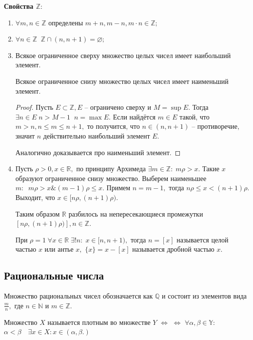 \par\medskip \textbf{Свойства $\mathbb{Z}:$}\par
\begin{enumerate}
\item $\forall m, n\in \mathbb{Z}$ определены $m+n, m-n, m\cdot n \in\mathbb{Z};$
\item $\forall n\in\mathbb{Z}\;\; \mathbb{Z}\cap(n, n+1)=\varnothing;$
\item Всякое ограниченное сверху множество целых чисел имеет наибольший элемент.
\par Всякое ограниченное снизу множество целых чисел имеет наименьший элемент.
\begin{proof}
Пусть $E\subset\mathbb{Z}, E$ -- ограничено сверху и $M=\sup E.$ Тогда $\exists n\in E \; n>M-1 \;\; n =\max E.$ Если найдётся $m\in E$ такой, что $m>n, n\leq m\leq n+1,$ то получится, что $n\in(n, n+1)$ -- противоречие, значит $n$ действительно наибольший элемент $E.$

Аналогично доказывается про наименьший элемент.
\end{proof}
\item Пусть $\rho>0, x\in\mathbb{R},$ по принципу Архимеда $\exists m\in\mathbb{Z}: \; m\rho>x.$ Такие $x$ образуют ограниченное снизу множество. Выберем наименьшее $m:\;\; m\rho>x \mathbin{\&} (m-1)\rho\leq x.$ Примем $n=m-1,$ тогда $n\rho\leq x< (n+1)\rho.$ Выходит, что $x\in[n\rho, (n+1)\rho).$ 

Таким образом $\mathbb{R}$ разбилось на непересекающиеся промежутки $[n\rho, (n+1)\rho)], n\in\mathbb{Z}.$

При $\rho=1 \; \forall x\in\mathbb{R} \; \exists! n: \; x\in[n,n+1),$ тогда $n=[x]$ называется целой частью $x$ или антье $x,$ $\{x\}=x-[x]$ называется дробной частью $x.$
\end{enumerate}
\subsection{Рациональные числа}

\begin{Definition}
Множество рациональных чисел обозначается как $\mathbb{Q}$ и состоит из элементов вида $\frac{m}{n},$ где $n\in \mathbb{N}$ и $m\in\mathbb{Z}.$
\end{Definition}

\begin{Definition}
Множество $X$ называется плотным во множестве $Y$ \quad $\Leftrightarrow$ \quad $\Leftrightarrow$ $\forall \alpha, \beta \in \mathbb{Y}:$ $\alpha<\beta \quad \exists x\in X: x\in(\alpha,\beta.)$
\end{Definition}

